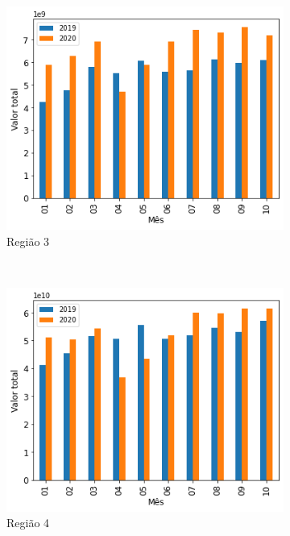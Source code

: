 \begin{figure}[htb]
    \begin{subfigure}[b]{0.45\textwidth}
        \includegraphics[scale=0.45]{images/base-de-dados-13.3-comparacao-valor-total-por-regiao.png}
        \caption{Região 3}
        \label{fig:pandemia:base-de-dados-13.3-comparacao-valor-total-por-regiao}
    \end{subfigure} ~ \quad
    \begin{subfigure}[b]{0.45\textwidth}
        \includegraphics[scale=0.45]{images/base-de-dados-13.4-comparacao-valor-total-por-regiao.png}
        \caption{Região 4}
        \label{fig:pandemia:base-de-dados-13.4-comparacao-valor-total-por-regiao}
    \end{subfigure} ~ \\
    \begin{subfigure}[b]{0.45\textwidth} 

\end{subfigure}
\end{figure}
